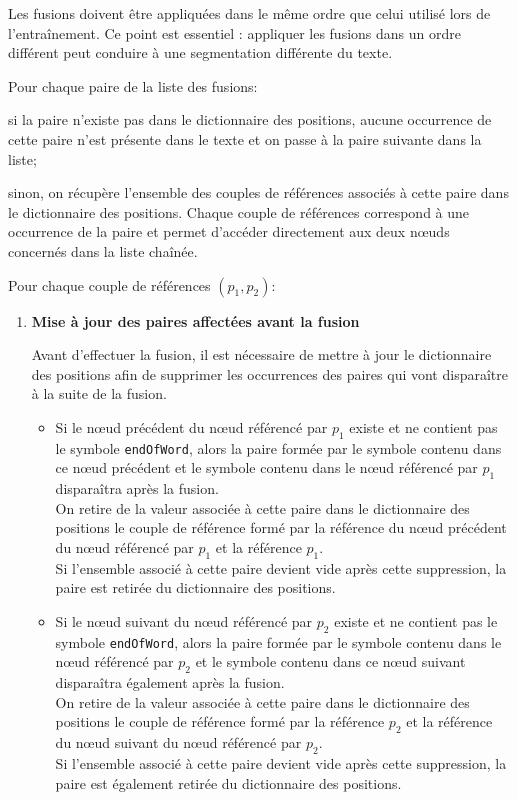 \documentclass[12pt,a4paper]{report}
\begin{document}
\begin{enumerate}
		Les fusions doivent être appliquées dans le même ordre que celui utilisé lors de l'entraînement. Ce point est essentiel : appliquer les fusions dans un ordre différent peut conduire à une segmentation différente du texte.
		
		Pour chaque paire de la liste des fusions:
		
		
		Pour chaque couple de références $(p_1, p_2)$:
		
		\begin{enumerate}
			\item \textbf{Mise à jour des paires affectées avant la fusion}
			
			Avant d'effectuer la fusion, il est nécessaire de mettre à jour le dictionnaire des positions afin de supprimer les occurrences des paires qui vont disparaître à la suite de la fusion.
			
			\begin{itemize}
				\item Si le nœud précédent du nœud référencé par $p_1$ existe et ne contient pas le symbole \texttt{endOfWord}, alors la paire formée par le symbole contenu dans ce nœud précédent et le symbole contenu dans le nœud référencé par $p_1$ disparaîtra après la fusion.\\
				On retire de la valeur associée à cette paire dans le dictionnaire des positions le couple de référence formé par la référence du nœud précédent du nœud référencé par $p_1$ et la référence $p_1$.\\
				Si l'ensemble associé à cette paire devient vide après cette suppression, la paire est retirée du dictionnaire des positions.
				
				\item Si le nœud suivant du nœud référencé par $p_2$  existe et ne contient pas le symbole \texttt{endOfWord}, alors la paire formée par le symbole contenu dans le nœud référencé par $p_2$ et le symbole contenu dans ce nœud suivant disparaîtra également après la fusion.\\
				On retire de la valeur associée à cette paire dans le dictionnaire des positions le couple de référence formé par la référence $p_2$ et la référence du nœud suivant du nœud référencé par $p_2$.\\
				Si l'ensemble associé à cette paire devient vide après cette suppression, la paire est également retirée du dictionnaire des positions.
			\end{itemize}
			

\end{enumerate}
\end{enumerate}
\end{document}
